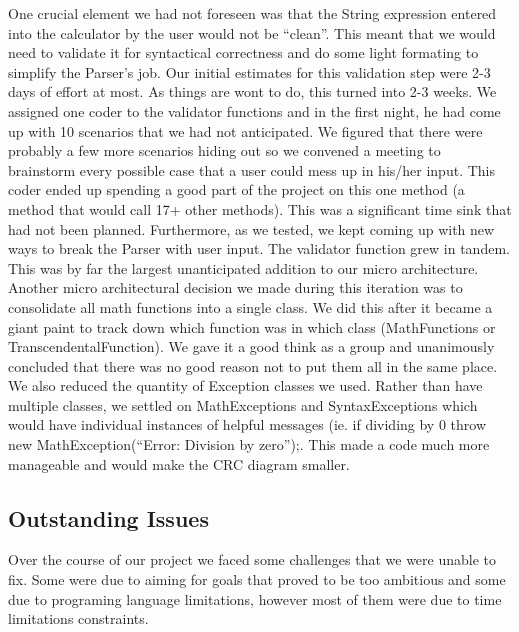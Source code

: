\documentclass[a4paper, 12pt]{article}
\begin{document}
One crucial element we had not foreseen was that the String expression entered into the calculator by the user would not be “clean”. This meant that we would need to validate it for syntactical correctness and do some light formating to simplify the Parser’s job. Our initial estimates for this validation step were 2-3 days of effort at most. As things are wont to do, this turned into 2-3 weeks. We assigned one coder to the validator functions and in the first night, he had come up with 10 scenarios that we had not anticipated. We figured that there were probably a few more scenarios hiding out so we convened a meeting to brainstorm every possible case that a user could mess up in his/her input. This coder ended up spending a good part of the project on this one method (a method that would call 17+ other methods). This was a significant time sink that had not been planned. Furthermore, as we tested, we kept coming up with new ways to break the Parser with user input. The validator function grew in tandem. This was by far the largest unanticipated addition to our micro architecture.
\\

Another micro architectural decision we made during this iteration was to consolidate all math functions into a single class. We did this after it became a giant paint to track down which function was in which class (MathFunctions or TranscendentalFunction). We gave it a good think as a group and unanimously concluded that there was no good reason not to put them all in the same place.
\\

We also reduced the quantity of Exception classes we used. Rather than have multiple classes, we settled on MathExceptions and SyntaxExceptions which would have individual instances of helpful messages (ie. if dividing by 0 throw new MathException(“Error: Division by zero”);. This made a code much more manageable and would make the CRC diagram smaller.


\subsection{Outstanding Issues}

Over the course of our project we faced some challenges that we were unable to fix. Some were due to aiming for goals that proved to be too ambitious and some due to programing language limitations, however most of them were due to time limitations constraints.
\\
\end{document}
